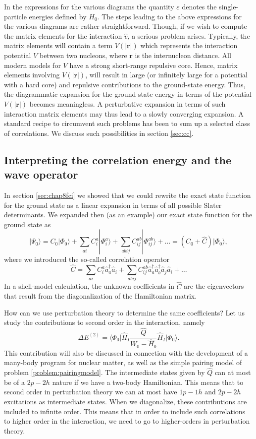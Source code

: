   In the expressions for the various diagrams the quantity $\varepsilon$ denotes the single-particle energies
  defined by $H_0$.  The steps leading to the above expressions for
  the various diagrams are rather straightforward. Though, if we wish
  to compute the matrix elements for the interaction $\hat{v}$, a serious
  problem arises. Typically, the matrix elements will contain a term
  $V(|{\mathbf r}|)$
  which represents the interaction potential $V$ between two nucleons,
  where ${\mathbf r}$ is the internucleon distance.  All modern models
  for $V$ have a strong short-range repulsive core. Hence, matrix
  elements involving $V(|{\mathbf r}|)$, will result in large (or
  infinitely large for a potential with a hard core) and repulsive
  contributions to the ground-state energy. Thus, the diagrammatic
  expansion for the ground-state energy in terms of the potential
  $V(|{\mathbf r}|)$ becomes meaningless. A perturbative expansion in terms of
such interaction matrix elements may thus lead to a slowly converging expansion.
A standard recipe to circumvent such problems has been to sum up 
a selected class of correlations. We discuss such possibilities in section \ref{sec:cc}.  



  \subsection{Interpreting the correlation energy and the wave operator}

  In section \ref{sec:chap8fci} we showed that we could rewrite the exact state
  function for the ground state as a linear expansion in terms of all
  possible Slater determinants.  We expanded then (as an example) our
  exact state function for the ground state as
  \[
  |\Psi_0\rangle=C_0|\Phi_0\rangle+\sum_{ai}C_i^a|\Phi_i^a\rangle+\sum_{abij}C_{ij}^{ab}|\Phi_{ij}^{ab}\rangle+\dots
  =(C_0+\hat{C})|\Phi_0\rangle,
  \]
  where we introduced the so-called correlation operator
  \[
  \hat{C}=\sum_{ai}C_i^a\hat{a}_{a}^{\dagger}\hat{a}_i
  +\sum_{abij}C_{ij}^{ab}\hat{a}_{a}^{\dagger}\hat{a}_{b}^{\dagger}\hat{a}_j\hat{a}_i+\dots
  \]
  In a shell-model calculation, the unknown coefficients in $\hat{C}$
  are the eigenvectors that result from the diagonalization of the
  Hamiltonian matrix.

  How can we use perturbation theory to determine the same
  coefficients? Let us study the contributions to second order in the
  interaction, namely
  \[
  \Delta E^{(2)}=\langle\Phi_0\vert
  \hat{H}_I\frac{\hat{Q}}{W_0-\hat{H}_0}\hat{H}_I\vert \Phi_0\rangle.
  \]
  This contribution will also be discussed in connection with the
  development of a many-body program for nuclear matter, as well as
  the simple pairing model of problem \ref{problem:pairingmodel}.  The
  intermediate states given by $\hat{Q}$ can at most be of a $2p-2h$
  nature if we have a two-body Hamiltonian. This means that to second
  order in perturbation theory we can at most have $1p-1h$ and $2p-2h$
  excitations as intermediate states. When we diagonalize, these
  contributions are included to infinite order. This means that in
  order to include such correlations to higher order in the
  interaction, we need to go to higher-orders in perturbation theory.

